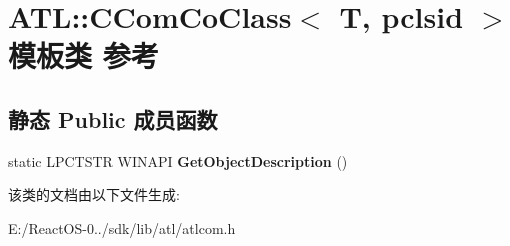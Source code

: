 \hypertarget{class_a_t_l_1_1_c_com_co_class}{}\section{A\+TL\+:\+:C\+Com\+Co\+Class$<$ T, pclsid $>$ 模板类 参考}
\label{class_a_t_l_1_1_c_com_co_class}
\subsection*{静态 Public 成员函数}
\begin{DoxyCompactItemize}
\item 
\mbox{\label{class_a_t_l_1_1_c_com_co_class_a1f2b8ca2b0964cecc3c92f79dfd7c910}} 
static L\+P\+C\+T\+S\+TR W\+I\+N\+A\+PI {\bfseries Get\+Object\+Description} ()
\end{DoxyCompactItemize}


该类的文档由以下文件生成\+:\begin{DoxyCompactItemize}
\item 
E\+:/\+React\+O\+S-\/0../sdk/lib/atl/atlcom.\+h\end{DoxyCompactItemize}
